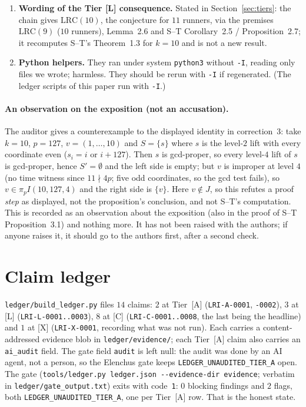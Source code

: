 \documentclass[10pt]{article}
\newcommand{\tier}[1]{\textsf{[#1]}}
\newcommand{\tA}{\tier{A}}
\newcommand{\tL}{\tier{L}}
\newcommand{\tC}{\tier{C}}
\newcommand{\tX}{\tier{X}}
\newcommand{\LRC}[1]{\mathrm{LRC}(#1)}
\begin{document}
\begin{enumerate}
\item \textbf{Wording of the Tier \tL{} consequence.} Stated in Section~\ref{sec:tiers}: the chain gives $\LRC{10}$, the conjecture for $11$ runners, via the premises $\LRC9$ ($10$ runners), Lemma~2.6 and S--T Corollary~2.5 / Proposition~2.7; it recomputes S--T's Theorem~1.3 for $k=10$ and is not a new result.
\item \textbf{Python helpers.} They ran under system \texttt{python3} without \texttt{-I}, reading only files we wrote; harmless. They should be rerun with \texttt{-I} if regenerated. (The ledger scripts of this paper run with \texttt{-I}.)
\end{enumerate}
\paragraph{An observation on the exposition (not an accusation).} The auditor gives a counterexample to the displayed identity in correction~3: take $k=10$, $p=127$, $v=(1,\dots,10)$ and $S=\{s\}$ where $s$ is the level-$2$ lift with every coordinate even ($s_i=i$ or $i+127$). Then $s$ is gcd-proper, so every level-$4$ lift of $s$ is gcd-proper, hence $S'=\emptyset$ and the left side is empty; but $v$ is improper at level $4$ (no time witness since $11\nmid4p$; five odd coordinates, so the gcd test fails), so $v\in\pi_pI(10,127,4)$ and the right side is $\{v\}$. Here $v\notin J$, so this refutes a proof \emph{step} as displayed, not the proposition's conclusion, and not S--T's computation. This is recorded as an observation about the exposition (also in the proof of S--T Proposition~3.1) and nothing more. It has not been raised with the authors; if anyone raises it, it should go to the authors first, after a second check.

\section{Claim ledger}\label{sec:ledger}
\texttt{ledger/build\_ledger.py} files $14$ claims: $2$ at Tier~\tA{} (\texttt{LRI-A-0001}, \texttt{-0002}), $3$ at \tL{} (\texttt{LRI-L-0001..0003}), $8$ at \tC{} (\texttt{LRI-C-0001..0008}, the last being the headline) and $1$ at \tX{} (\texttt{LRI-X-0001}, recording what was not run). Each carries a content-addressed evidence blob in \texttt{ledger/evidence/}; each Tier~\tA{} claim also carries an \texttt{ai\_audit} field. The gate field \texttt{audit} is left null: the audit was done by an AI agent, not a person, so the Elenchus gate keeps \texttt{LEDGER\_UNAUDITED\_TIER\_A} open. The gate (\texttt{tools/ledger.py ledger.json -{}-evidence-dir evidence}; verbatim in \texttt{ledger/gate\_output.txt}) exits with code~\texttt{1}: $0$ blocking findings and $2$ flags, both \texttt{LEDGER\_UNAUDITED\_TIER\_A}, one per Tier~\tA{} row. That is the honest state.
\end{document}
